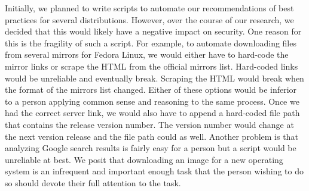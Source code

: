 \documentclass[conference]{IEEEtran}
\begin{document}
Initially, we planned to write scripts to automate our recommendations of best practices
for several distributions. However, over the course of our research, we decided that this
would likely have a negative impact on security. One reason for this is the fragility of
such a script. For example, to automate downloading files from several mirrors for Fedora
Linux, we would either have to hard-code the mirror links or scrape the HTML from the
official mirrors list. Hard-coded links would be unreliable and eventually break. Scraping
the HTML would break when the format of the mirrors list changed. 
Either of these options would be inferior to a person applying
common sense and reasoning to the same process. Once we had the correct server link, we would
also have to append a hard-coded file path that contains the release version number. The version
number would change at the next version release and the file path could as well. Another
problem is that analyzing Google
search results is fairly easy for a person but a script would be unreliable at best.
We posit that downloading an image for a new operating system is an infrequent and 
important enough task that the person wishing to do so should devote their full attention
to the task.

%
%

\end{document}
